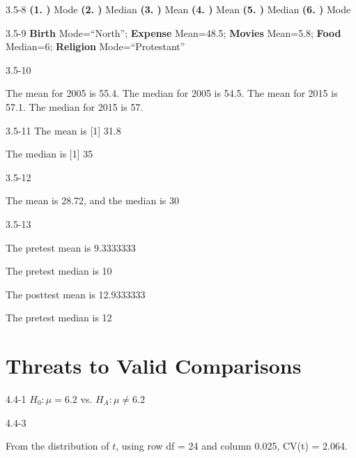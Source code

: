 \begin{exsol@solution}{3.5-8}
  {\bf{(1. )}} Mode  {\bf{(2. )}} Median  {\bf{(3. )}} Mean  {\bf{(4. )}} Mean  {\bf{(5. )}} Median  {\bf{(6. )}} Mode

\end{exsol@solution}
\begin{exsol@solution}{3.5-9}
     {\bf{Birth}} Mode=``North'';   {\bf{Expense}} Mean=48.5; {\bf{Movies}} Mean=5.8; {\bf{Food}} Median=6;  {\bf{Religion}} Mode=``Protestant''

\end{exsol@solution}
\begin{exsol@solution}{3.5-10}

The mean for 2005 is 55.4.
The median for 2005 is 54.5.
The mean for 2015 is 57.1.
The median for 2015 is 57.

\end{exsol@solution}
\begin{exsol@solution}{3.5-11}
	The mean is
[1] 31.8


	The median is
[1] 35


\end{exsol@solution}
\begin{exsol@solution}{3.5-12}


  The mean is 28.72, and the median is 30

\end{exsol@solution}
\begin{exsol@solution}{3.5-13}



	The pretest mean is  9.3333333


	The pretest median is 10


	The posttest mean is	12.9333333


The pretest median is 12

\end{exsol@solution}
\setcounter{chapter}{3}\chapter{Threats to Valid Comparisons}
\begin{exsol@solution}{4.4-1}
	  $H_0: \mu = 6.2$ vs. $H_A: \mu \neq 6.2$
\end{exsol@solution}
\begin{exsol@solution}{4.4-3}

    From the distribution of $t$, using row df = 24 and column 0.025, CV(t) = 2.064.
\end{exsol@solution}
